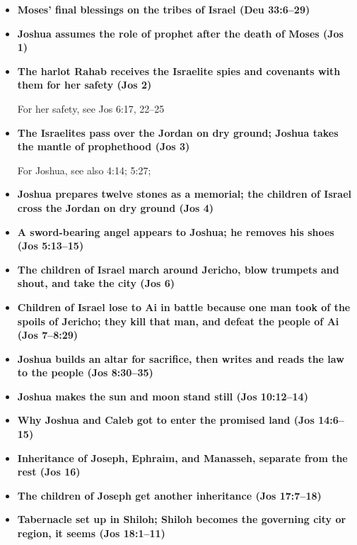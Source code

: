 \begin{itemize}
\item \textbf{Moses' final blessings on the tribes of Israel (Deu 33:6--29)}

\item \textbf{Joshua assumes the role of prophet after the death of Moses (Jos 1)}

\item \textbf{The harlot Rahab receives the Israelite spies and covenants with them for her safety (Jos 2)}

	For her safety, see Jos 6:17, 22--25

\item \textbf{The Israelites pass over the Jordan on dry ground; Joshua takes the mantle of prophethood (Jos 3)}

	For Joshua, see also 4:14; 5:27;

\item \textbf{Joshua prepares twelve stones as a memorial; the children of Israel cross the Jordan on dry ground (Jos 4)}

\item \textbf{A sword-bearing angel appears to Joshua; he removes his shoes (Jos 5:13--15)}

\item \textbf{The children of Israel march around Jericho, blow trumpets and shout, and take the city (Jos 6)}

\item \textbf{Children of Israel lose to Ai in battle because one man took of the spoils of Jericho; they kill that man, and defeat the people of Ai (Jos 7--8:29)}

\item \textbf{Joshua builds an altar for sacrifice, then writes and reads the law to the people (Jos 8:30--35)}

\item \textbf{Joshua makes the sun and moon stand still (Jos 10:12--14)}

\item \textbf{Why Joshua and Caleb got to enter the promised land (Jos 14:6--15)}

\item \textbf{Inheritance of Joseph, Ephraim, and Manasseh, separate from the rest (Jos 16)}

\item \textbf{The children of Joseph get another inheritance (Jos 17:7--18)}

\item \textbf{Tabernacle set up in Shiloh; Shiloh becomes the governing city or region, it seems (Jos 18:1--11)}


\end{itemize}
